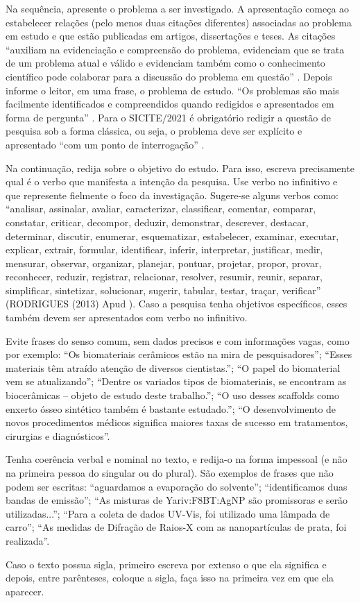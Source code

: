 \documentclass[%
  article,%
  a4paper,%
  11pt,%
  fleqn,%
  oneside,%
  chapter = TITLE,%
  section = TITLE,%
]{abntex2}
\begin{document}
Na sequência, apresente o problema a ser investigado. A apresentação começa ao estabelecer relações (pelo menos duas citações diferentes) associadas ao problema em estudo e que estão publicadas em artigos, dissertações e teses. As citações ``auxiliam na evidenciação e compreensão do problema, evidenciam que se trata de um problema atual e válido e evidenciam também como o conhecimento científico pode colaborar para a discussão do problema em questão'' \cite[p.~94]{SORDI_2013}. Depois informe o leitor, em uma frase, o problema de estudo. ``Os problemas são mais facilmente identificados e compreendidos quando redigidos e apresentados em forma de pergunta'' \cite[p.~96]{SORDI_2013}. Para o SICITE/2021 é obrigatório redigir a questão de pesquisa sob a forma clássica, ou seja, o problema deve ser explícito e apresentado ``com um ponto de interrogação'' \cite[p.~35]{SORDI_2017}.
\par Na continuação, redija sobre o objetivo do estudo. Para isso, escreva precisamente qual é o verbo que manifesta a intenção da pesquisa. Use verbo no infinitivo e que represente fielmente o foco da investigação. Sugere-se alguns verbos como: ``analisar, assinalar, avaliar, caracterizar, classificar, comentar, comparar, constatar, criticar, decompor, deduzir, demonstrar, descrever, destacar, determinar, discutir, enumerar, esquematizar, estabelecer, examinar, executar, explicar, extrair, formular, identificar, inferir, interpretar, justificar, medir, mensurar, observar, organizar, planejar, pontuar, projetar, propor, provar, reconhecer, reduzir, registrar, relacionar, resolver, resumir, reunir, separar, simplificar, sintetizar, solucionar, sugerir, tabular, testar, traçar, verificar'' (RODRIGUES (2013) Apud \cite[p.~62]{MEDEIROS_2016}). Caso a pesquisa tenha objetivos específicos, esses também devem ser apresentados com verbo no infinitivo.

Evite  frases do senso comum, sem dados precisos e com informações vagas, como por exemplo: ``Os biomateriais cerâmicos estão na mira de pesquisadores''; ``Esses materiais têm atraído atenção de diversos cientistas.''; ``O papel do biomaterial vem se atualizando''; ``Dentre os variados tipos de biomateriais, se encontram as biocerâmicas – objeto de estudo deste trabalho.''; ``O uso desses scaffolds como enxerto ósseo sintético também é bastante estudado.''; ``O desenvolvimento de novos procedimentos médicos significa maiores taxas de sucesso em tratamentos, cirurgias e diagnósticos''.
\par Tenha coerência verbal e nominal no texto, e redija-o na forma impessoal (e não na primeira pessoa do singular ou do plural). São exemplos de frases que não podem ser escritas:  ``aguardamos a evaporação do solvente''; ``identificamos duas bandas de emissão''; ``As misturas de Yariv:F8BT:AgNP são promissoras e serão utilizadas...'';  ``Para a coleta de dados UV-Vis, foi utilizado uma lâmpada de carro''; ``As medidas de Difração de Raios-X com as nanopartículas de prata, foi realizada''.
\par Caso o texto possua sigla, primeiro escreva por extenso o que ela significa e depois, entre parênteses, coloque a sigla, faça isso na primeira vez em que ela aparecer.
\end{document}
